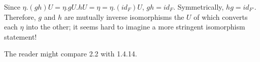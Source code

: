 Since $\eta.(gh)U = \eta.gU.hU = \eta = \eta.(id_F)U$, $gh = id_F$. Symmetrically, $hg = id_{F'}$. Therefore, $g$ and $h$ are mutually inverse isomorphisms the $U$ of which converts each $\eta$ into the other; it seems hard to imagine a more stringent isomorphism statement!

The reader might compare 2.2 with 1.4.14.